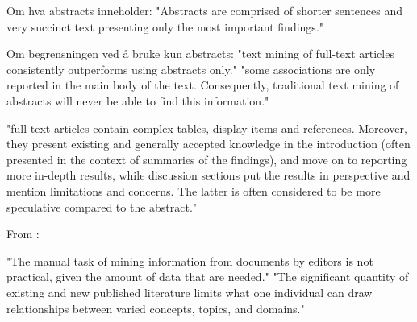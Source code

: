 Om hva abstracts inneholder:
"Abstracts are comprised of shorter sentences and very succinct text presenting only the most important findings."

Om begrensningen ved å bruke kun abstracts:
"text mining of full-text articles consistently outperforms using abstracts only."
"some associations are only reported in the main body of the text. Consequently, traditional text mining of abstracts will never be able to find this information."

"full-text articles contain complex tables, display items and references. Moreover, they present existing and generally accepted knowledge in the introduction (often presented in the context of summaries of the findings), and move on to reporting more in-depth results, while discussion sections put the results in perspective and mention limitations and concerns. The latter is often considered to be more speculative compared to the abstract."

From \parencite{olivetti2020data_driven_materials_research_enabled_natural_language_processing_information_extraction}:

"The manual task of mining information from documents by editors is not practical, given the amount of data that are needed."
"The significant quantity of existing and new published literature limits what one individual can draw relationships between varied concepts, topics, and domains."